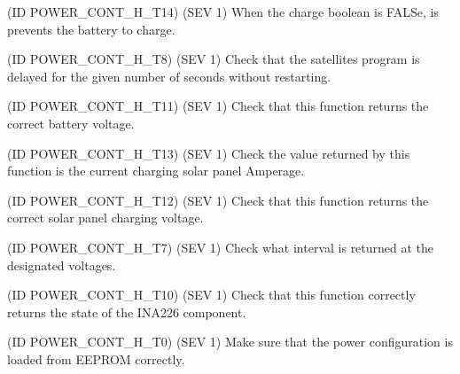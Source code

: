 \begin{DoxyRefList}
(ID P\+O\+W\+E\+R\+\_\+\+C\+O\+N\+T\+\_\+\+H\+\_\+\+T14) (S\+EV 1) When the charge boolean is F\+A\+L\+Se, is prevents the battery to charge. 
\item[\label{test__test000043}%
\Hypertarget{test__test000043}%
Global \hyperlink{power__control_8h_a3bff1402f7ac79b23628326e3fd7b560}{Power\+\_\+\+Control\+\_\+\+Delay} (uint32\+\_\+t ms, bool sleep, bool sleep\+Radio=false)](ID P\+O\+W\+E\+R\+\_\+\+C\+O\+N\+T\+\_\+\+H\+\_\+\+T8) (S\+EV 1) Check that the satellite\textquotesingle{}s program is delayed for the given number of seconds without restarting. 
\item[\label{test__test000046}%
\Hypertarget{test__test000046}%
Global \hyperlink{power__control_8h_a6e2a22c1b8940caf3a89cf6f5e21e120}{Power\+\_\+\+Control\+\_\+\+Get\+\_\+\+Battery\+\_\+\+Voltage} ()](ID P\+O\+W\+E\+R\+\_\+\+C\+O\+N\+T\+\_\+\+H\+\_\+\+T11) (S\+EV 1) Check that this function returns the correct battery voltage. 
\item[\label{test__test000048}%
\Hypertarget{test__test000048}%
Global \hyperlink{power__control_8h_a38b1cf7d6af2bdccef1488666b05eda6}{Power\+\_\+\+Control\+\_\+\+Get\+\_\+\+Charging\+\_\+\+Current} ()](ID P\+O\+W\+E\+R\+\_\+\+C\+O\+N\+T\+\_\+\+H\+\_\+\+T13) (S\+EV 1) Check the value returned by this function is the current charging solar panel Amperage. 
\item[\label{test__test000047}%
\Hypertarget{test__test000047}%
Global \hyperlink{power__control_8h_ae60f6f685745e08c9ffbd6b6fbc025b9}{Power\+\_\+\+Control\+\_\+\+Get\+\_\+\+Charging\+\_\+\+Voltage} ()](ID P\+O\+W\+E\+R\+\_\+\+C\+O\+N\+T\+\_\+\+H\+\_\+\+T12) (S\+EV 1) Check that this function returns the correct solar panel charging voltage. 
\item[\label{test__test000042}%
\Hypertarget{test__test000042}%
Global \hyperlink{power__control_8h_aa26e5dcfde1aecf602a3a41ef6e205b8}{Power\+\_\+\+Control\+\_\+\+Get\+\_\+\+Sleep\+\_\+\+Interval} ()](ID P\+O\+W\+E\+R\+\_\+\+C\+O\+N\+T\+\_\+\+H\+\_\+\+T7) (S\+EV 1) Check what interval is returned at the designated voltages. 
\item[\label{test__test000045}%
\Hypertarget{test__test000045}%
Global \hyperlink{power__control_8h_ac78b055f83071530eb3844378654db5e}{Power\+\_\+\+Control\+\_\+\+I\+N\+A226\+\_\+\+Check} ()](ID P\+O\+W\+E\+R\+\_\+\+C\+O\+N\+T\+\_\+\+H\+\_\+\+T10) (S\+EV 1) Check that this function correctly returns the state of the I\+N\+A226 component. 
\item[\label{test__test000039}%
\Hypertarget{test__test000039}%
Global \hyperlink{power__control_8h_a67027a313959753703a50352ee41b109}{Power\+\_\+\+Control\+\_\+\+Load\+\_\+\+Configuration} ()](ID P\+O\+W\+E\+R\+\_\+\+C\+O\+N\+T\+\_\+\+H\+\_\+\+T0) (S\+EV 1) Make sure that the power configuration is loaded from E\+E\+P\+R\+OM correctly. 

\end{DoxyRefList}
